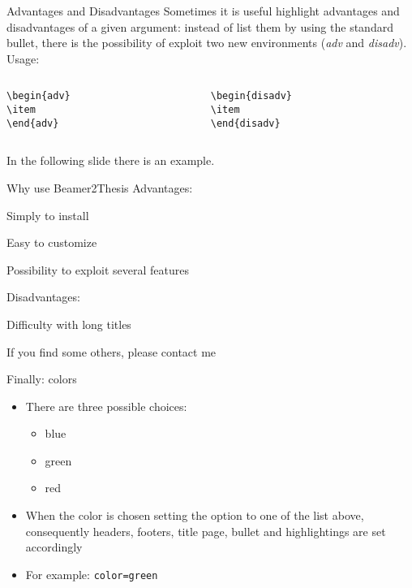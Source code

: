 \begin{frame}[t,fragile]{Advantages and Disadvantages}
Sometimes it is useful highlight advantages and disadvantages of a given argument: instead of list them by using the standard bullet, there is the possibility of exploit two new environments (\emph{adv} and \emph{disadv}). Usage:
\begin{columns}
\begin{column}{0.3\paperwidth}
\begin{verbatim}
\begin{adv}
\item 
\end{adv}
\end{verbatim}
\end{column}
\begin{column}{0.3\paperwidth}
\begin{verbatim}
\begin{disadv}
\item 
\end{disadv}
\end{verbatim}
\end{column}
\end{columns}
\bigskip
In the following slide there is an example.
\end{frame}

\begin{tframe}{Why use Beamer2Thesis}
Advantages:
\begin{adv}
\item Simply to install
\item Easy to customize
\item Possibility to exploit several features
\end{adv}
Disadvantages:
\begin{disadv}
\item Difficulty with long titles
\item If you find some others, please contact me 
\end{disadv}

\end{tframe}

\begin{frame}[t,fragile]{Finally: colors}
\begin{itemize}
\item There are three possible choices:
\begin{itemize}
\item blue
\item green
\item red
\end{itemize}
\item When the color is chosen setting the option  to one of the list above, consequently headers, footers, title page, bullet and highlightings are set accordingly
\item For example: \verb!color=green!
\end{itemize}
\end{frame}


